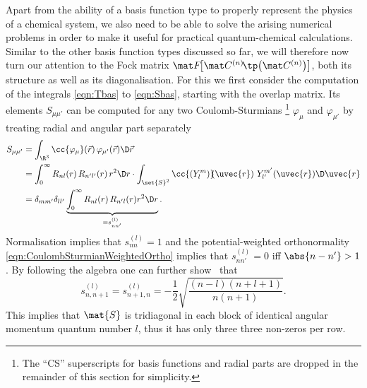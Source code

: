 Apart from the ability of a basis function type to properly
represent the physics of a chemical system, we also need to be able
to solve the arising numerical problems
in order to make it useful for practical quantum-chemical calculations.
Similar to the other basis function types discussed so far,
we will therefore now turn our attention to the Fock matrix $\matFnfull$,
both its structure as well as its diagonalisation.
For this we first consider the computation of the integrals
\eqref{eqn:Tbas} to \eqref{eqn:Sbas},
starting with the overlap matrix.
Its elements $S_{\mu\mu'}$ can be computed
for any two Coulomb-Sturmians%
\footnote{The ``CS'' superscripts for basis functions
and radial parts are dropped in the remainder of this section for simplicity.}
$\varphi_{\mu}$ and $\varphi_{\mu'}$
by treating radial and angular part separately~\cite{Avery2015}
\begin{equation}
	\begin{aligned}
	S_{\mu\mu'} &= \int_{\R^3} \cc{\varphi_{\mu}}(\vec{r}) \, \varphi_{\mu'}(\vec{r})  \D\vec{r} \\
	&= \int_0^\infty R_{nl}(r)\, R_{n'l'}(r) \, r^2 \D r \cdot
		\int_{\set{S}^2} \cc{\left(Y^m_l\right)}\!\!(\uvec{r}) \,\,
			Y^{m'}_{l'}(\uvec{r}) \D \uvec{r} \\
			&= \delta_{m m'} \delta_{l l'}
				\underbrace{\int_0^\infty R_{nl}(r)\, R_{n'l}(r) r^2 \D r}_{= s^{(l)}_{n n'}}.
	\end{aligned}
	\label{eqn:OverlapCS}
\end{equation}
Normalisation implies that $s^{(l)}_{n n} = 1$
and the potential-weighted orthonormality \eqref{eqn:CoulombSturmianWeightedOrtho}
implies that $s^{(l)}_{n n'} = 0$ iff $\abs{n -n'} > 1$.
By following the algebra one can further show~\cite{Avery2015} that
\[
	s^{(l)}_{n,n+1} = s^{(l)}_{n+1,n} = - \frac12 \sqrt{\frac{(n-l)(n+l+1)}{n (n+1)}}.
\]
This implies that $\mat{S}$ is tridiagonal in each block
of identical angular momentum quantum number $l$,
thus it has only three three non-zeros per row.

